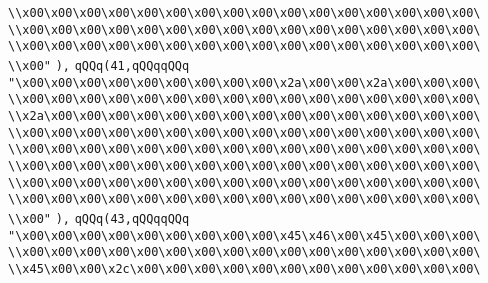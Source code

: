 \verb|\\x00\x00\x00\x00\x00\x00\x00\x00\x00\x00\x00\x00\x00\x00\x00\x00\|\newline
\verb|\\x00\x00\x00\x00\x00\x00\x00\x00\x00\x00\x00\x00\x00\x00\x00\x00\|\newline
\verb|\\x00\x00\x00\x00\x00\x00\x00\x00\x00\x00\x00\x00\x00\x00\x00\x00\|\newline
\verb|\\x00"|\newline
\verb|),|\newline
\verb|qQQq(41,qQQqqQQq|\newline
\verb|"\x00\x00\x00\x00\x00\x00\x00\x00\x00\x2a\x00\x00\x2a\x00\x00\x00\|\newline
\verb|\\x00\x00\x00\x00\x00\x00\x00\x00\x00\x00\x00\x00\x00\x00\x00\x00\|\newline
\verb|\\x2a\x00\x00\x00\x00\x00\x00\x00\x00\x00\x00\x00\x00\x00\x00\x00\|\newline
\verb|\\x00\x00\x00\x00\x00\x00\x00\x00\x00\x00\x00\x00\x00\x00\x00\x00\|\newline
\verb|\\x00\x00\x00\x00\x00\x00\x00\x00\x00\x00\x00\x00\x00\x00\x00\x00\|\newline
\verb|\\x00\x00\x00\x00\x00\x00\x00\x00\x00\x00\x00\x00\x00\x00\x00\x00\|\newline
\verb|\\x00\x00\x00\x00\x00\x00\x00\x00\x00\x00\x00\x00\x00\x00\x00\x00\|\newline
\verb|\\x00\x00\x00\x00\x00\x00\x00\x00\x00\x00\x00\x00\x00\x00\x00\x00\|\newline
\verb|\\x00"|\newline
\verb|),|\newline
\verb|qQQq(43,qQQqqQQq|\newline
\verb|"\x00\x00\x00\x00\x00\x00\x00\x00\x00\x45\x46\x00\x45\x00\x00\x00\|\newline
\verb|\\x00\x00\x00\x00\x00\x00\x00\x00\x00\x00\x00\x00\x00\x00\x00\x00\|\newline
\verb|\\x45\x00\x00\x2c\x00\x00\x00\x00\x00\x00\x00\x00\x00\x00\x00\x00\|\newline
